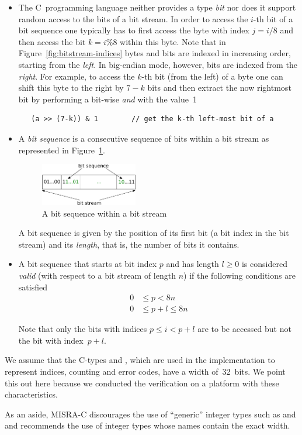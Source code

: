 \begin{itemize}
\item 
The C~programming language neither provides a type \emph{bit}
nor does it support random access to the bits of a bit stream.
In order to access the $i$-th bit of a bit sequence one typically
has to first access the byte with index $j = i/8$ and then access the 
bit $k = i \% 8$ within this byte.
Note that in Figure~\ref{fig:bitstream-indices} 
bytes and bits are indexed in increasing order, starting from the \emph{left}.
In big-endian mode, however, bits are indexed from the \emph{right}.
For example, to access the $k$-th bit (from the left) of a byte  one can
shift this byte to the right by $7-k$ bits and then extract the now
rightmost bit by performing a bit-wise \emph{and} with the value~1
%
\begin{verbatim}
   (a >> (7-k)) & 1        // get the k-th left-most bit of a
\end{verbatim}

\item
A \emph{bit sequence} is a consecutive sequence of bits within a bit stream
as represented in Figure~\ref{fig:bitsequence}.
\begin{figure}[hbt]
\begin{center}
\includegraphics[width=0.40\textwidth]{figures/bit_sequence.pdf}
\caption{\label{fig:bitsequence} A bit sequence within a bit stream}
\end{center}
\end{figure}

A bit sequence is given by the position of its first bit (a bit index in the bit stream)
and its \emph{length}, that is, the number of bits it contains.

\item

A bit sequence that starts at bit index $p$ and has
length $l \geq 0$ is considered \emph{valid} (with respect to a bit stream of length $n$)
if the following conditions are satisfied
\begin{align*}
  0 &\leq p < 8n \\
  0 &\leq p + l \leq 8n
\end{align*}

Note that only the bits with indices $p \leq i < p + l$ are to be accessed
but not the bit with index~$p+l$.

\end{itemize}

We assume that the C-types  and , which
are used in the implementation to represent indices, counting and error codes,
have a width of~32~bits.
We point this out here because we conducted the verification on a platform with
these characteristics.

As an aside, MISRA-C discourages the use of ``generic'' integer types
such as  and  and recommends the use of integer types whose names
contain the exact width.

